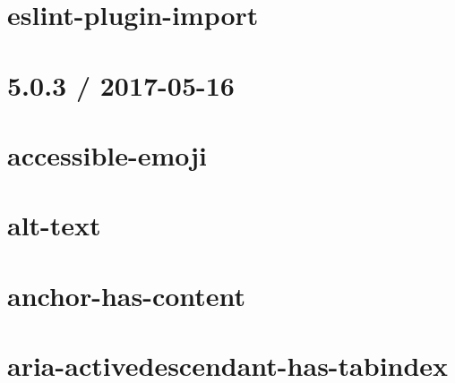 \documentclass[twoside]{book}
\newcommand{\+}{\discretionary{\mbox{\scriptsize$\hookleftarrow$}}{}{}}
\begin{document}
\chapter{eslint-\/plugin-\/import}
\label{md__c_1_workspace_demo_src_main_script_node_modules_eslint-plugin-import__r_e_a_d_m_e}

\chapter{5.0.3 / 2017-\/05-\/16}
\label{md__c_1_workspace_demo_src_main_script_node_modules_eslint-plugin-jsx-a11y__c_h_a_n_g_e_l_o_g}

\chapter{accessible-\/emoji}
\label{md__c_1_workspace_demo_src_main_script_node_modules_eslint-plugin-jsx-a11y_docs_rules_accessible-emoji}

\chapter{alt-\/text}
\label{md__c_1_workspace_demo_src_main_script_node_modules_eslint-plugin-jsx-a11y_docs_rules_alt-text}

\chapter{anchor-\/has-\/content}
\label{md__c_1_workspace_demo_src_main_script_node_modules_eslint-plugin-jsx-a11y_docs_rules_anchor-has-content}

\chapter{aria-\/activedescendant-\/has-\/tabindex}
\label{md__c_1_workspace_demo_src_main_script_node_modules_eslint-plugin-jsx-a11y_docs_rules_aria-activedescendant-has-tabindex}

\end{document}

